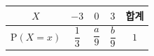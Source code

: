 {\setlength{\tabcolsep}{7pt}\renewcommand{\arraystretch}{1.5}%
\begin{tabular}{|c|c|c|c|c|}
\hline
$X$ & $-3$ & $0$ & $3$ & \textbf{합계} \\
\hline
$\mathrm{P}(X=x)$ & $\dfrac{1}{3}$ & $\dfrac{a}{9}$ & $\dfrac{b}{9}$ & $1$ \\
\hline
\end{tabular}}
